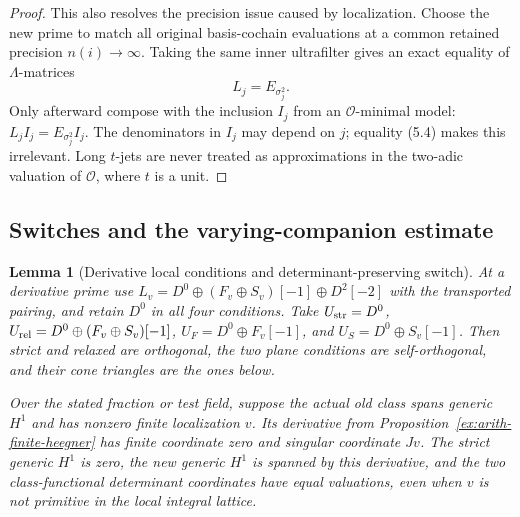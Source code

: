 \documentclass[11pt]{article}
\newtheorem{lemma}[theorem]{Lemma}
\theoremstyle{definition}
\theoremstyle{remark}
\providecommand{\mathscr}[1]{\mathcal{#1}}
\begin{document}
\begin{proof}
This also resolves the precision issue caused by localization.
Choose the new prime to match all original basis-cochain evaluations
at a common retained precision $n(i)\to\infty$. Taking the same inner
ultrafilter gives an exact equality of $\Lambda$-matrices
\[
                 L_j=E_{\sigma_j^2}.                            \tag{5.4}
\]
Only afterward compose with the inclusion $I_j$ from an
$\mathscr O$-minimal model:
$L_jI_j=E_{\sigma_j^2}I_j$.
The denominators in $I_j$ may depend on $j$; equality (5.4) makes this
irrelevant. Long $t$-jets are never treated as approximations in the
two-adic valuation of $\mathscr O$, where $t$ is a unit.
\end{proof}

\subsection{Switches and the varying-companion estimate}
\begin{lemma}[Derivative local conditions and determinant-preserving switch]\label{ex:limits-derivative-switch}
At a derivative prime use
$L_v=D^0\oplus(F_v\oplus S_v)[-1]\oplus D^2[-2]$ with the
transported pairing, and retain $D^0$ in all four conditions.
Take $U_{\rm str}=D^0$,
$U_{\rm rel}=D^0\oplus(F_v\oplus S_v)[-1]$,
$U_F=D^0\oplus F_v[-1]$, and $U_S=D^0\oplus S_v[-1]$.
Then strict and relaxed are orthogonal, the two plane conditions
are self-orthogonal, and their cone triangles are the ones below.

Over the stated fraction or test field, suppose the actual old
class spans generic $H^1$ and has nonzero finite localization $v$.
Its derivative from Proposition~\ref{ex:arith-finite-heegner}
has finite coordinate zero and singular coordinate $Jv$.
The strict generic $H^1$ is zero, the new generic $H^1$ is spanned
by this derivative, and the two class-functional determinant
coordinates have equal valuations, even when $v$ is not primitive
in the local integral lattice.
\end{lemma}
\end{document}
